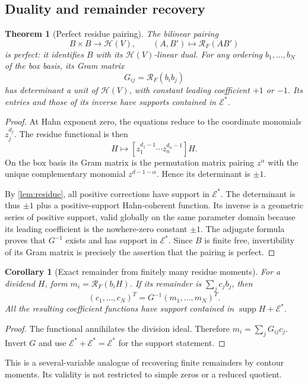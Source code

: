 \documentclass[11pt,letterpaper]{article}
\newtheorem{theorem}{Theorem}[section]
\newtheorem{corollary}[corollary]{Corollary}
\theoremstyle{definition}
\theoremstyle{remark}
\newcommand{\HH}{\mathscr H}
\newcommand{\EE}{\mathcal E}
\newcommand{\supp}{\operatorname{supp}}
\numberwithin{equation}{section}
\begin{document}
\subsection{Duality and remainder recovery}
\begin{theorem}[Perfect residue pairing]\label{thm:duality}
The bilinear pairing
\begin{equation}\label{eq:pairing}
 B\times B\longrightarrow\HH(V),\qquad
 (A,B')\longmapsto\mathcal R_F(AB')
\end{equation}
is perfect: it identifies $B$ with its $\HH(V)$-linear dual. For any ordering $b_1,\ldots,b_N$ of the box basis, its Gram matrix
\[
 G_{ij}=\mathcal R_F(b_i b_j)
\]
has determinant a unit of $\HH(V)$, with constant leading coefficient $+1$ or $-1$. Its entries and those of its inverse have supports contained in $\EE^*$.
\end{theorem}
\begin{proof}
At Hahn exponent zero, the equations reduce to the coordinate monomials $z_j^{d_j}$. The residue functional is then
\[
 H\longmapsto[z_1^{d_1-1}\cdots z_n^{d_n-1}]H.
\]
On the box basis its Gram matrix is the permutation matrix pairing $z^\alpha$ with the unique complementary monomial $z^{d-1-\alpha}$. Hence its determinant is $\pm1$.

By \cref{lem:residue}, all positive corrections have support in $\EE^*$. The determinant is thus $\pm1$ plus a positive-support Hahn-coherent function. Its inverse is a geometric series of positive support, valid globally on the same parameter domain because its leading coefficient is the nowhere-zero constant $\pm1$. The adjugate formula proves that $G^{-1}$ exists and has support in $\EE^*$. Since $B$ is finite free, invertibility of its Gram matrix is precisely the assertion that the pairing is perfect.
\end{proof}

\begin{corollary}[Exact remainder from finitely many residue moments]\label{cor:recovery}
For a dividend $H$, form $m_i=\mathcal R_F(b_iH)$. If its remainder is $\sum_j c_jb_j$, then
\begin{equation}\label{eq:recovery}
 (c_1,\ldots,c_N)^T=G^{-1}(m_1,\ldots,m_N)^T.
\end{equation}
All the resulting coefficient functions have support contained in $\supp H+\EE^*$.
\end{corollary}
\begin{proof}
The functional annihilates the division ideal. Therefore $m_i=\sum_jG_{ij}c_j$. Invert $G$ and use $\EE^*+\EE^*=\EE^*$ for the support statement.
\end{proof}
This is a several-variable analogue of recovering finite remainders by contour moments. Its validity is not restricted to simple zeros or a reduced quotient.
\end{document}
